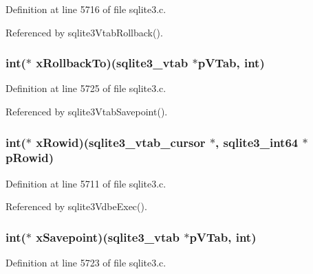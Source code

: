 Definition at line 5716 of file sqlite3.\+c.



Referenced by sqlite3\+Vtab\+Rollback().

\hypertarget{structsqlite3__module_a60182ac3b9950dcfd82b2aeea5bd0451}{}
\subsubsection[{x\+Rollback\+To}]{\setlength{\rightskip}{0pt plus 5cm}int($\ast$ x\+Rollback\+To)({\bf sqlite3\+\_\+vtab} $\ast$p\+V\+Tab, int)}\label{structsqlite3__module_a60182ac3b9950dcfd82b2aeea5bd0451}


Definition at line 5725 of file sqlite3.\+c.



Referenced by sqlite3\+Vtab\+Savepoint().

\hypertarget{structsqlite3__module_a73d33a68f6567fd14c90145a4b2a8cb3}{}
\subsubsection[{x\+Rowid}]{\setlength{\rightskip}{0pt plus 5cm}int($\ast$ x\+Rowid)({\bf sqlite3\+\_\+vtab\+\_\+cursor} $\ast$, {\bf sqlite3\+\_\+int64} $\ast$p\+Rowid)}\label{structsqlite3__module_a73d33a68f6567fd14c90145a4b2a8cb3}


Definition at line 5711 of file sqlite3.\+c.



Referenced by sqlite3\+Vdbe\+Exec().

\hypertarget{structsqlite3__module_a48098f89820c71bfa3cf4ec8a0e2b51a}{}
\subsubsection[{x\+Savepoint}]{\setlength{\rightskip}{0pt plus 5cm}int($\ast$ x\+Savepoint)({\bf sqlite3\+\_\+vtab} $\ast$p\+V\+Tab, int)}\label{structsqlite3__module_a48098f89820c71bfa3cf4ec8a0e2b51a}


Definition at line 5723 of file sqlite3.\+c.



